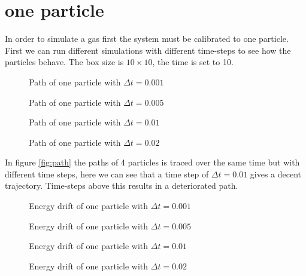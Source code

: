 \documentclass[10pt,a4paper,aps,twocolumn,secnumarabic,numerical,balancelastpage,nofootinbib,superscriptaddress]{revtex4-2}
\begin{document}
	
	\section{one particle}
		In order to simulate a gas first the system must be calibrated to one particle. First we can run different simulations with different time-steps to see how the particles behave. The box size is $10\times10$, the time is set to 10.
	\begin{figure*}[htb]
		\centering
		\begin{subfigure}{.45\textwidth}
			\hspace*{-2.6cm}\scalebox{0.9}{}
			\caption{Path of one particle with $\Delta t=0.001$}
		\end{subfigure}
		\begin{subfigure}{.45\textwidth}
			\hspace*{-2.6cm}\scalebox{0.9}{}
			\caption{Path of one particle with $\Delta t=0.005$}
		\end{subfigure}
		\begin{subfigure}{.45\textwidth}
			\hspace*{-2.6cm}\scalebox{0.9}{}
			\caption{Path of one particle with $\Delta t=0.01$}
		\end{subfigure}
		\begin{subfigure}{.45\textwidth}
			\hspace*{-2.6cm}\scalebox{0.9}{}
			\caption{Path of one particle with $\Delta t=0.02$}
		\end{subfigure}
		\caption{\label{fig:path}Path of one particle with different values of time step $\Delta t$ the wall constant $K=6000$}
	\end{figure*}
	In figure \ref{fig:path} the paths of 4 particles is traced over the same time but with different time steps, here we can see that a time step of $\Delta t = 0.01$ gives a decent trajectory. Time-steps above this results in a deteriorated path.
	\begin{figure*}[htb]
		\centering
		\begin{subfigure}{.45\textwidth}
			\scalebox{0.6}{}
			\caption{Energy drift of one particle with $\Delta t=0.001$}
		\end{subfigure}
		\begin{subfigure}{.45\textwidth}
			\scalebox{0.6}{}
			\caption{Energy drift of one particle with $\Delta t=0.005$}
		\end{subfigure}
		\begin{subfigure}{.45\textwidth}
			\scalebox{0.6}{}
			\caption{Energy drift of one particle with $\Delta t=0.01$}
		\end{subfigure}
		\begin{subfigure}{.45\textwidth}
			\scalebox{0.6}{}
			\caption{Energy drift of one particle with $\Delta t=0.02$}
		\end{subfigure}
		\caption{\label{energy-timestep}Energy drift of one particle with different values of time step $dt$, the initial energy is set to 40}
	\end{figure*}
\end{document}
